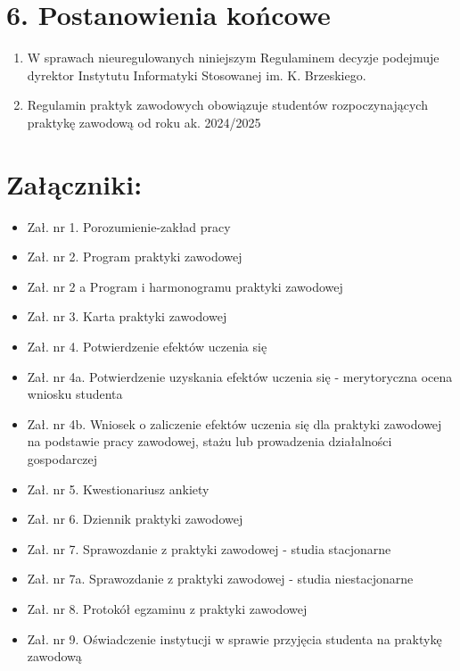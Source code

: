 \documentclass[12pt,a4paper]{article}
\begin{document}
\section*{6. Postanowienia końcowe}
\begin{enumerate}[label=\arabic*)]
    \item W sprawach nieuregulowanych niniejszym Regulaminem decyzje podejmuje dyrektor Instytutu Informatyki Stosowanej im. K. Brzeskiego.
    \item Regulamin praktyk zawodowych obowiązuje studentów rozpoczynających praktykę zawodową od roku ak. 2024/2025
\end{enumerate}

\section*{Załączniki:}
\begin{itemize}[label=--]
    \item Zał. nr 1. Porozumienie-zakład pracy
    \item Zał. nr 2. Program praktyki zawodowej
    \item Zał. nr 2 a Program i harmonogramu praktyki zawodowej
    \item Zał. nr 3. Karta praktyki zawodowej
    \item Zał. nr 4. Potwierdzenie efektów uczenia się
    \item Zał. nr 4a. Potwierdzenie uzyskania efektów uczenia się - merytoryczna ocena wniosku studenta
    \item Zał. nr 4b. Wniosek o zaliczenie efektów uczenia się dla praktyki zawodowej na podstawie pracy zawodowej, stażu lub prowadzenia działalności gospodarczej
    \item Zał. nr 5. Kwestionariusz ankiety
    \item Zał. nr 6. Dziennik praktyki zawodowej
    \item Zał. nr 7. Sprawozdanie z praktyki zawodowej - studia stacjonarne
    \item Zał. nr 7a. Sprawozdanie z praktyki zawodowej - studia niestacjonarne
    \item Zał. nr 8. Protokół egzaminu z praktyki zawodowej
    \item Zał. nr 9. Oświadczenie instytucji w sprawie przyjęcia studenta na praktykę zawodową
\end{itemize}
\end{document}
